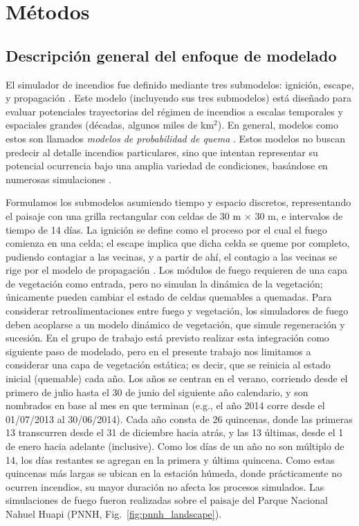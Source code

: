 \section{Métodos}

\subsection{Descripción general del enfoque de modelado}

El simulador de incendios fue definido mediante tres submodelos: ignición, escape, y propagación \citep{marchal_turning_2020}.  Este modelo (incluyendo sus tres submodelos) está diseñado para evaluar potenciales trayectorias del régimen de incendios a escalas temporales y espaciales grandes (décadas, algunos miles de km$^2$). En general, modelos como estos son llamados \textit{modelos de probabilidad de quema} \citep{parisien2019applications}. Estos modelos no buscan predecir al detalle incendios particulares, sino que intentan representar su potencial ocurrencia bajo una amplia variedad de condiciones, basándose en numerosas simulaciones \citep{parisien2020commentary}.

Formulamos los submodelos asumiendo tiempo y espacio discretos, representando el paisaje con una grilla rectangular con celdas de 30 m $\times$ 30 m, e intervalos de tiempo de 14 días. La ignición se define como el proceso por el cual el fuego comienza en una celda; el escape implica que dicha celda se queme por completo, pudiendo contagiar a las vecinas, y a partir de ahí, el contagio a las vecinas se rige por el modelo de propagación \citep{marchal_turning_2020}. Los módulos de fuego requieren de una capa de vegetación como entrada, pero no simulan la dinámica de la vegetación; únicamente pueden cambiar el estado de celdas quemables a quemadas. Para considerar retroalimentaciones entre fuego y vegetación, los simuladores de fuego deben acoplarse a un modelo dinámico de vegetación, que simule regeneración y sucesión. En el grupo de trabajo está previsto realizar esta integración como siguiente paso de modelado, pero en el presente trabajo nos limitamos a considerar una capa de vegetación estática; es decir, que se reinicia al estado inicial (quemable) cada año. Los años se centran en el verano, corriendo desde el primero de julio hasta el 30 de junio del siguiente año calendario, y son nombrados en base al mes en que terminan (e.g., el año 2014 corre desde el 01/07/2013 al 30/06/2014). Cada año consta de 26 quincenas, donde las primeras 13 transcurren desde el 31 de diciembre hacia atrás, y las 13 últimas, desde el 1 de enero hacia adelante (inclusive). Como los días de un año no son múltiplo de 14, los días restantes se agregan en la primera y última quincena. Como estas quincenas más largas se ubican en la estación húmeda, donde prácticamente no ocurren incendios, su mayor duración no afecta los procesos simulados. Las simulaciones de fuego fueron realizadas sobre el paisaje del Parque Nacional Nahuel Huapi (PNNH, Fig.~\ref{fig:pnnh_landscape}). 

